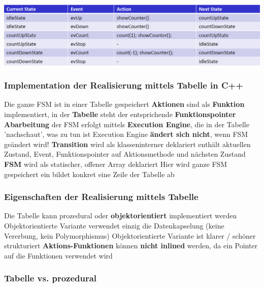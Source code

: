 \includegraphics[width=\columnwidth]{images/fsm_tabelle.png}


\subsubsection{Implementation der Realisierung mittels Tabelle in C++}

\begin{outline}
    \1 Die ganze FSM ist in einer Tabelle gespeichert
    \1 \textbf{Aktionen} sind als \textbf{Funktion} implementiert, in der \textbf{Tabelle} steht der entsprichende \textbf{Funktionspointer} %
    \1 \textbf{Abarbeitung} der FSM erfolgt mittels \textbf{Execution Engine}, die in der Tabelle 'nachschaut', was zu tun ist
        \2 Execution Engine \textbf{ändert sich nicht}, wenn FSM geändert wird!
    \1 \textbf{Transition} wird als klasseninterner  deklariert
        \2 enthält aktuellen Zustand, Event, Funktionspointer auf Aktionsmethode und nächsten Zustand
    \1 \textbf{FSM} wird als statischer, offener Array deklariert
        \2 Hier wird ganze FSM gespeichert
        \2 ein  bildet konkret eine Zeile der Tabelle ab
\end{outline}


\subsubsection{Eigenschaften der Realisierung mittels Tabelle}

\begin{outline}
    \1 Die Tabelle kann prozedural oder \textbf{objektorientiert} implementiert werden
        \2 Objektorientierte Variante verwendet einzig die Datenkapselung (keine Vererbung, kein Polymorphismus)
        \2 Objektorientierte Variante ist klarer / schöner strukturiert
    \1 \textbf{Aktions-Funktionen} können \textbf{nicht inlined} werden, da ein Pointer auf die Funktionen verwendet wird
\end{outline}


\subsubsection{Tabelle vs. prozedural}

